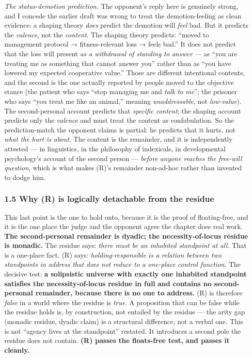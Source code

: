 \documentclass[11pt]{article}
\begin{document}
\emph{The status-demotion prediction.} The opponent's reply here is genuinely strong, and I concede the earlier draft was wrong to treat the demotion-feeling as clean evidence: a shaping theory \emph{does} predict the demotion will \emph{feel} bad. But it predicts the \emph{valence}, not the \emph{content}. The shaping theory predicts: ``moved to management protocol → fitness-relevant loss → feels bad.'' It does not predict that the loss will present \emph{as a withdrawal of standing to answer} — as ``you are treating me as something that cannot answer you'' rather than as ``you have lowered my expected cooperative value.'' Those are different intentional contents, and the second is the one actually reported by people moved to the objective stance (the patient who says ``stop managing me and \emph{talk to me}''; the prisoner who says ``you treat me like an animal,'' meaning \emph{unaddressable}, not \emph{low-value}). The second-personal account predicts that \emph{specific content}; the shaping account predicts only the \emph{valence} and must treat the content as confabulation. So the prediction-match the opponent claims is partial: he predicts that it hurts, not \emph{what the hurt is about}. The content is the remainder, and it is independently attested — in linguistics, in the philosophy of indexicals, in developmental psychology's account of the second person — \emph{before anyone reaches the free-will question}, which is what makes (R)'s remainder non-ad-hoc rather than invented to dodge him.

\subsubsection*{1.5 Why (R) is logically detachable from the residue}

This last point is the one to hold onto, because it is the proof of floating-free, and it is the one place the judge and the opponent agree the chapter does real work. \textbf{The second-personal remainder is dyadic; the necessity-of-locus residue is monadic.} The residue says: \emph{there must be an inhabited standpoint at all.} That is a one-place fact. (R) says: \emph{holding-responsible is a relation between two standpoints in address that does not reduce to a one-place control function.} The decisive test: \textbf{a solipsistic universe with exactly one inhabited standpoint satisfies the necessity-of-locus residue in full and contains no second-personal remainder, because there is no one to address.} (R) is therefore \emph{false} in a world where the residue is \emph{true}. A proposition that can be false while the residue holds is, by construction, not entailed by the residue — the arity gap (monadic residue, dyadic claim) is a structural difference, not a verbal one. This is not ``agency lives at the standpoint'' restated. It introduces a second pole the residue does not contain. \textbf{(R) passes the floats-free test, and passes it cleanly.}
\end{document}
